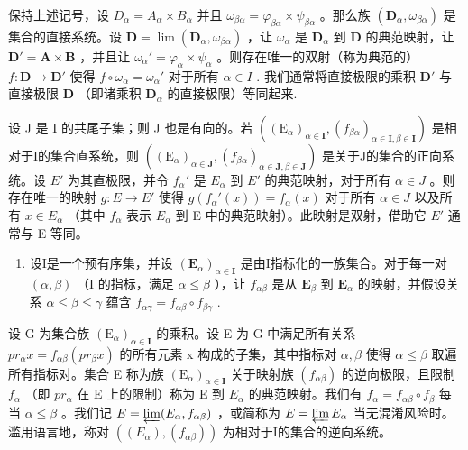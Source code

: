 保持上述记号，设 \(D_{\alpha}=A_{\alpha}\times B_{\alpha}\) 并且 \(\omega_{\beta\alpha}=\varphi_{\beta\alpha}\times\psi_{\beta\alpha}\) 。那么族 \((\mathbf{D}_{\alpha},\omega_{\beta\alpha})\) 是集合的直接系统。设 \(\mathbf{D}=\lim(\mathbf{D}_{\alpha},\omega_{\beta\alpha})\) ，让 \(\omega_{\alpha}\) 是 \(\mathbf{D}_{\alpha}\) 到 \(\mathbf{D}\) 的典范映射，让 \(\mathbf{D}' = \mathbf{A} \times \mathbf{B}\) ，并且让 \(\omega_{\alpha}' = \varphi_{\alpha} \times \psi_{\alpha}\) 。则存在唯一的双射（称为典范的） \(f: \mathbf{D} \to \mathbf{D}'\) 使得 \(f \circ \omega_{\alpha} = \omega_{\alpha}'\) 对于所有 \(\alpha \in I\) . 我们通常将直接极限的乘积 \(\mathbf{D}'\) 与直接极限 \(\mathbf{D}\) （即诸乘积 \(\mathbf{D}_{\alpha}\) 的直接极限）等同起来.

设 J 是 I 的共尾子集；则 J 也是有向的。若 \(((\mathrm{E}_{\alpha})_{\alpha\in\mathbf{I}}, (f_{\beta\alpha})_{\alpha\in\mathbf{I},\beta\in\mathbf{I}})\) 是相对于I的集合直系统，则 \(((\mathrm{E}_{\alpha})_{\alpha\in\mathbf{J}}, (f_{\beta\alpha})_{\alpha\in\mathbf{J},\beta\in\mathbf{J}})\) 是关于J的集合的正向系统。设 \(E'\) 为其直极限，并令 \(f_{\alpha}'\) 是 \(E_{\alpha}\) 到 \(E'\) 的典范映射，对于所有 \(\alpha\in J\) 。则存在唯一的映射 \(g:E\to E'\) 使得 \(g(f_{\alpha}'(x))=f_{\alpha}(x)\) 对于所有 \(\alpha\in J\) 以及所有 \(x\in E_{\alpha}\) （其中 \(f_{\alpha}\) 表示 \(E_{\alpha}\) 到 E 中的典范映射）。此映射是双射，借助它 \(E'\) 通常与 E 等同。

\begin{enumerate}
\def\labelenumi{\arabic{enumi}.}
\setcounter{enumi}{13}
\tightlist
\item
  设I是一个预有序集，并设 \((\mathbf{E}_{\alpha})_{\alpha \in \mathbf{I}}\) 是由I指标化的一族集合。对于每一对 \((\alpha, \beta)\) （I 的指标，满足 \(\alpha \leqslant \beta\) ），让 \(f_{\alpha \beta}\) 是从 \(\mathbf{E}_{\beta}\) 到 \(\mathbf{E}_{\alpha}\) 的映射，并假设关系 \(\alpha \leqslant \beta \leqslant \gamma\) 蕴含 \(f_{\alpha \gamma} = f_{\alpha \beta} \circ f_{\beta \gamma}\) .
\end{enumerate}

设 G 为集合族 \((\mathrm{E}_{\alpha})_{\alpha\in\mathbf{I}}\) 的乘积。设 E 为 G 中满足所有关系 \(pr_{\alpha}x = f_{\alpha\beta}(pr_{\beta}x)\) 的所有元素 x 构成的子集，其中指标对 \(\alpha, \beta\) 使得 \(\alpha \leqslant \beta\) 取遍所有指标对。集合 E 称为族 \((\mathrm{E}_{\alpha})_{\alpha\in\mathbf{I}}\) 关于映射族 \((f_{\alpha\beta})\) 的逆向极限，且限制 \(f_{\alpha}\) （即 \(pr_{\alpha}\) 在 E 上的限制）称为 E 到 \(E_{\alpha}\) 的典范映射。我们有 \(f_{\alpha} = f_{\alpha\beta} \circ f_{\beta}\) 每当 \(\alpha \leqslant \beta\) 。我们记 \(E = \varprojlim(E_{\alpha}, f_{\alpha\beta})\) ，或简称为 \(E = \varprojlim E_{\alpha}\) 当无混淆风险时。滥用语言地，称对 \(((E_{\alpha}), (f_{\alpha\beta}))\) 为相对于I的集合的逆向系统。

